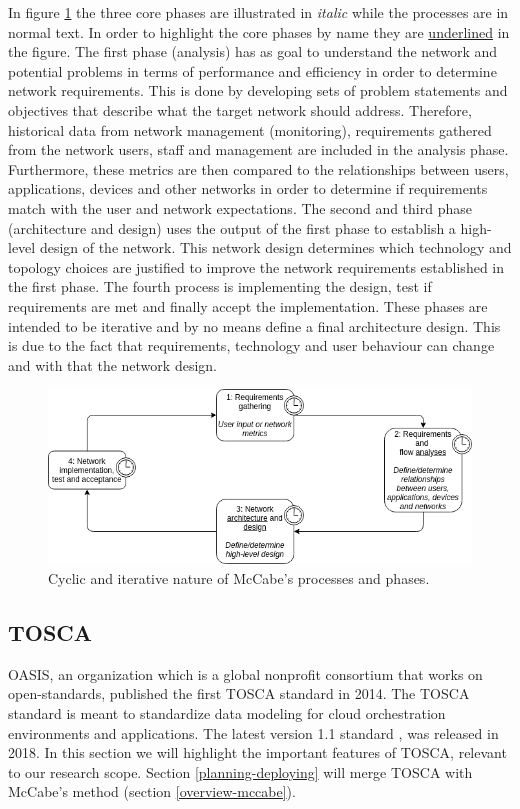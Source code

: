 In figure \ref{fig:mccabe-process} the three core phases are illustrated in \textit{italic} while the processes are in normal text. In order to highlight the core phases by name they are \underline{underlined} in the figure. The first phase (analysis) has as goal to understand the network and potential problems in terms of performance and efficiency in order to determine network requirements. This is done by developing sets of problem statements and objectives that describe what the target network should address. Therefore, historical data from network management (monitoring), requirements gathered from the network users, staff and management are included in the analysis phase. Furthermore, these metrics are then compared to the relationships between users, applications, devices and other networks in order to determine if requirements match with the user and network expectations. The second and third phase (architecture and design) uses the output of the first phase to establish a high-level design of the network. This network design determines which technology and topology choices are justified to improve the network requirements established in the first phase. The fourth process is implementing the design, test if requirements are met and finally accept the implementation. These phases are intended to be iterative and by no means define a final architecture design. This is due to the fact that requirements, technology and user behaviour can change and with that the network design.

\begin{figure}[H]
\centering
\includegraphics[width=\columnwidth]{Images/mccabe-process.png}
\caption{Cyclic and iterative nature of McCabe's processes and phases.}
\label{fig:mccabe-process}
\end{figure}

\subsection{TOSCA}
\label{overview-tosca}
OASIS, an organization which is a global nonprofit consortium that works on open-standards, published the first TOSCA standard in 2014. The TOSCA standard is meant to standardize data modeling for cloud orchestration environments and applications. The latest version 1.1 standard \cite{tosca-standard}, was released in 2018. In this section we will highlight the important features of TOSCA, relevant to our research scope. Section \ref{planning-deploying} will merge TOSCA with McCabe's method (section \ref{overview-mccabe}).


